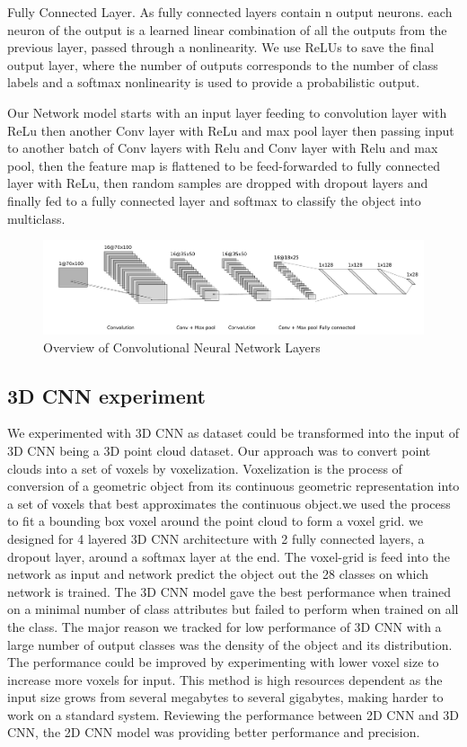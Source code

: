 Fully Connected Layer.
As fully connected layers contain n output neurons.
each neuron of the output is a learned linear combination of all the outputs from the previous layer,
passed through a nonlinearity.
We use ReLUs to save the final output layer, where the number of outputs corresponds
to the number of class labels and a softmax nonlinearity is used to provide a probabilistic output.


Our Network model starts with an input layer feeding to convolution layer with ReLu then
another Conv layer with ReLu and max pool layer then passing input to another batch of Conv layers
with Relu and Conv layer with Relu and max pool, then the feature map is flattened to be feed-forwarded to
fully connected layer with ReLu, then random samples are dropped with dropout layers
and finally fed to a fully connected layer and softmax to classify the object into multiclass.

\begin{figure}[!h]
     \begin{center}
       \includegraphics[width=1.1\textwidth]{./images/object_net.pdf}
       \caption{Overview of Convolutional Neural Network Layers}
       \label{fig:cnn}
     \end{center}
\end{figure}

\subsection{3D CNN experiment}
We experimented with 3D CNN as dataset could be transformed into the
input of 3D CNN being a 3D point cloud dataset. Our approach was to convert point clouds into a set of voxels by voxelization. Voxelization is the process of conversion of a geometric object from its
continuous geometric representation into a set of voxels that best approximates the continuous object.we used the process to fit a bounding box voxel around the point cloud to form a voxel grid. we designed for 4 layered 3D CNN architecture with 2 fully connected layers, a dropout layer, around a softmax layer at the end. The voxel-grid is feed into the network as input and network predict the object out the 28 classes on which network is trained. The 3D CNN model gave the best performance when trained on a minimal number of class attributes but failed to perform when trained on all the class. The major reason we tracked for low performance of 3D CNN with a large number of output classes was the
density of the object and its distribution.
The performance could be improved by experimenting with lower voxel size to increase more voxels for input. This method is high resources dependent as the input size grows from several megabytes to several gigabytes, making harder to work on a standard system. Reviewing the performance between 2D CNN and 3D CNN, the 2D CNN model was providing better performance and precision.
